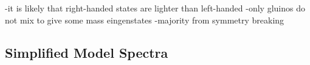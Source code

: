 -it is likely that right-handed states are lighter than left-handed
-only gluinos do not mix to give some mass eingenstates
	-majority from symmetry breaking



\subsection{Simplified Model Spectra}

